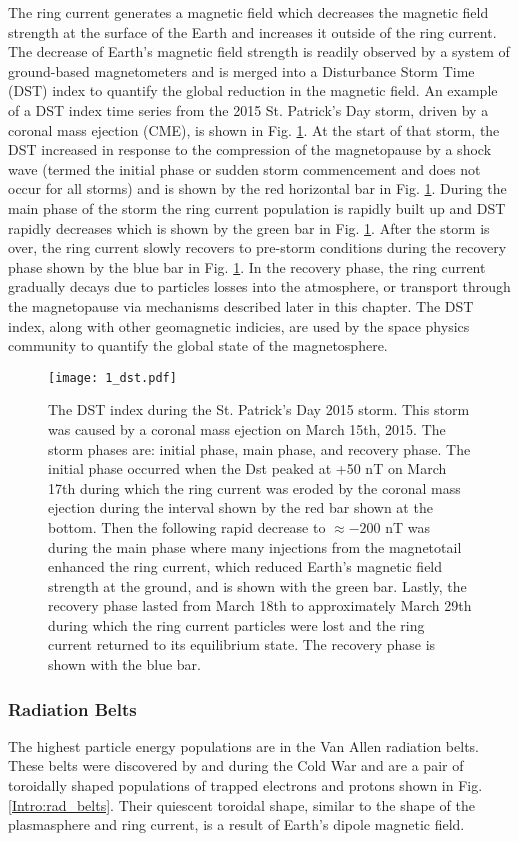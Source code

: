 The ring current generates a magnetic field which decreases the magnetic field strength at the surface of the Earth and increases it outside of the ring current. The decrease of Earth's magnetic field strength is readily observed by a system of ground-based magnetometers and is merged into a Disturbance Storm Time (DST) index to quantify the global reduction in the magnetic field. An example of a DST index time series from the 2015 St. Patrick's Day storm, driven by a coronal mass ejection (CME), is shown in Fig. \ref{Intro:dst}. At the start of that storm, the DST increased in response to the compression of the magnetopause by a shock wave (termed the initial phase or sudden storm commencement and does not occur for all storms) and is shown by the red horizontal bar in Fig. \ref{Intro:dst}. During the main phase of the storm the ring current population is rapidly built up and DST rapidly decreases which is shown by the green bar in Fig. \ref{Intro:dst}. After the storm is over, the ring current slowly recovers to pre-storm conditions during the recovery phase shown by the blue bar in Fig. \ref{Intro:dst}. In the recovery phase, the ring current gradually decays due to particles losses into the atmosphere, or transport through the magnetopause via mechanisms described later in this chapter. The DST index, along with other geomagnetic indicies, are used by the space physics community to quantify the global state of the magnetosphere.

\begin{figure}
\texttt{[image: 1\_dst.pdf]}
\caption{The DST index during the St. Patrick's Day 2015 storm. This storm was caused by a coronal mass ejection on March 15th, 2015. The storm phases are: initial phase, main phase, and recovery phase. The initial phase occurred when the Dst peaked at +50 nT on March 17th during which the ring current was eroded by the coronal mass ejection during the interval shown by the red bar shown at the bottom. Then the following rapid decrease to $\approx -200$ nT was during the main phase where many injections from the magnetotail enhanced the ring current, which reduced Earth's magnetic field strength at the ground, and is shown with the green bar. Lastly, the recovery phase lasted from March 18th to approximately March 29th during which the ring current particles were lost and the ring current returned to its equilibrium state. The recovery phase is shown with the blue bar.}
\label{Intro:dst}
\end{figure}

\subsubsection{Radiation Belts}\label{Intro:radiation_belt}
The highest particle energy populations are in the Van Allen radiation belts. These belts were discovered by \citet{Allen1959} and \citet{Vernov1960} during the Cold War and are a pair of toroidally shaped populations of trapped electrons and protons shown in Fig. \ref{Intro:rad_belts}. Their quiescent toroidal shape, similar to the shape of the plasmasphere and ring current, is a result of Earth's dipole magnetic field.

